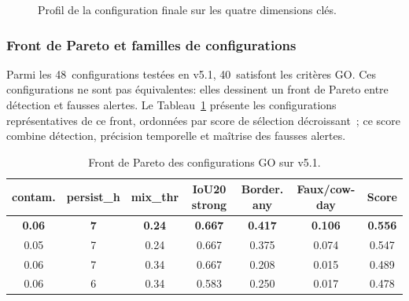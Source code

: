\begin{figure}[H]
    \centering
    \caption{Profil de la configuration finale sur les quatre dimensions clés.}
    \label{fig:profil_metriques}
\end{figure}

\FloatBarrier
\subsubsection{Front de Pareto et familles de configurations}

Parmi les 48~configurations testées en v5.1, 40~satisfont les critères GO. Ces
configurations ne sont pas équivalentes: elles dessinent un front de Pareto entre
détection et fausses alertes. Le Tableau~\ref{tab:pareto_frontier} présente les
configurations représentatives de ce front, ordonnées par score de sélection
décroissant~; ce score combine détection, précision temporelle et maîtrise des fausses
alertes.

\begin{table}[H]
    \centering
    \caption{Front de Pareto des configurations GO sur v5.1.}
    \label{tab:pareto_frontier}
    \small
    \begin{tabular}{ccccccc}
        \toprule
        \textbf{contam.} & \textbf{persist\_h} & \textbf{mix\_thr}
            & \textbf{IoU20 strong} & \textbf{Border. any}
            & \textbf{Faux/cow-day} & \textbf{Score} \\
        \midrule
        \textbf{0.06} & \textbf{7} & \textbf{0.24} & \textbf{0.667} & \textbf{0.417}
            & \textbf{0.106} & \textbf{0.556} \\
        0.05 & 7 & 0.24 & 0.667 & 0.375 & 0.074 & 0.547 \\
        0.06 & 7 & 0.34 & 0.667 & 0.208 & 0.015 & 0.489 \\
        0.06 & 6 & 0.34 & 0.583 & 0.250 & 0.017 & 0.478 \\
        \bottomrule
    \end{tabular}
\end{table}

